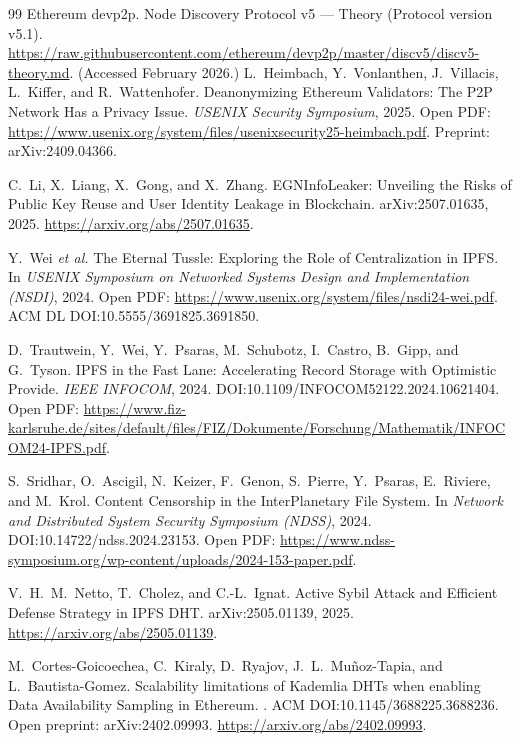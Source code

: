 \documentclass[11pt]{article}
\begin{document}
\begin{thebibliography}{99}
Ethereum devp2p.
\newblock Node Discovery Protocol v5 --- Theory (Protocol version v5.1).
\newblock \url{https://raw.githubusercontent.com/ethereum/devp2p/master/discv5/discv5-theory.md}. (Accessed February 2026.)
L.~Heimbach, Y.~Vonlanthen, J.~Villacis, L.~Kiffer, and R.~Wattenhofer.
\newblock Deanonymizing Ethereum Validators: The P2P Network Has a Privacy Issue.
\newblock \emph{USENIX Security Symposium}, 2025.
\newblock Open PDF: \url{https://www.usenix.org/system/files/usenixsecurity25-heimbach.pdf}.
\newblock Preprint: arXiv:2409.04366.

C.~Li, X.~Liang, X.~Gong, and X.~Zhang.
\newblock EGNInfoLeaker: Unveiling the Risks of Public Key Reuse and User Identity Leakage in Blockchain.
\newblock arXiv:2507.01635, 2025. \url{https://arxiv.org/abs/2507.01635}.


Y.~Wei \emph{et al.}
\newblock The Eternal Tussle: Exploring the Role of Centralization in IPFS.
\newblock In \emph{USENIX Symposium on Networked Systems Design and Implementation (NSDI)}, 2024.
\newblock Open PDF: \url{https://www.usenix.org/system/files/nsdi24-wei.pdf}.
\newblock ACM DL DOI:10.5555/3691825.3691850.

D.~Trautwein, Y.~Wei, Y.~Psaras, M.~Schubotz, I.~Castro, B.~Gipp, and G.~Tyson.
\newblock IPFS in the Fast Lane: Accelerating Record Storage with Optimistic Provide.
\newblock \emph{IEEE INFOCOM}, 2024.
\newblock DOI:10.1109/INFOCOM52122.2024.10621404.
\newblock Open PDF: \url{https://www.fiz-karlsruhe.de/sites/default/files/FIZ/Dokumente/Forschung/Mathematik/INFOCOM24-IPFS.pdf}. 

S.~Sridhar, O.~Ascigil, N.~Keizer, F.~Genon, S.~Pierre, Y.~Psaras, E.~Riviere, and M.~Krol.
\newblock Content Censorship in the InterPlanetary File System.
\newblock In \emph{Network and Distributed System Security Symposium (NDSS)}, 2024.
\newblock DOI:10.14722/ndss.2024.23153.
\newblock Open PDF: \url{https://www.ndss-symposium.org/wp-content/uploads/2024-153-paper.pdf}.

V.~H.~M.~Netto, T.~Cholez, and C.-L.~Ignat.
\newblock Active Sybil Attack and Efficient Defense Strategy in IPFS DHT.
\newblock arXiv:2505.01139, 2025. \url{https://arxiv.org/abs/2505.01139}.

M.~Cortes-Goicoechea, C.~Kiraly, D.~Ryajov, J.~L.~Mu\~noz-Tapia, and L.~Bautista-Gomez.
\newblock Scalability limitations of Kademlia DHTs when enabling Data Availability Sampling in Ethereum.
.
\newblock ACM DOI:10.1145/3688225.3688236. Open preprint: arXiv:2402.09993. \url{https://arxiv.org/abs/2402.09993}.


\end{thebibliography}
\end{document}
